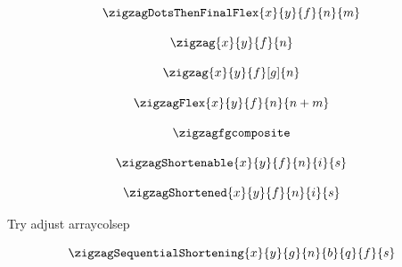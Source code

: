\begin{showexample}
\[
\arraycolsep=7pt
\zigzagDotsThenFinalFlex{x}{y}{f}{n}{m}
\]
\end{showexample}

\begin{showexample}
\[
\arraycolsep=7pt
\zigzag{x}{y}{f}{n}
\]
\end{showexample}

\begin{showexample}
\[
\arraycolsep=7pt
\zigzag{x}{y}{f}[g]{n}
\]
\end{showexample}

\begin{showexample}
\[
\arraycolsep=7pt
\zigzagFlex{x}{y}{f}{n}{n+m}
\]
\end{showexample}

\begin{showexample}
\[
\zigzagfgcomposite
\]
\end{showexample}

\begin{showexample}
\[
\arraycolsep=7pt
\zigzagShortenable{x}{y}{f}{n}{i}{s}
\]
\end{showexample}

\begin{showexample}
\[
\arraycolsep=7pt
\zigzagShortened{x}{y}{f}{n}{i}{s}
\]
\end{showexample}

Try adjust arraycolsep 
\newpage 
\begin{showexample}
\[
\zigzagSequentialShortening{x}{y}{g}{n}{b}{q}{f}{s}
\]
\end{showexample}

\newpage
